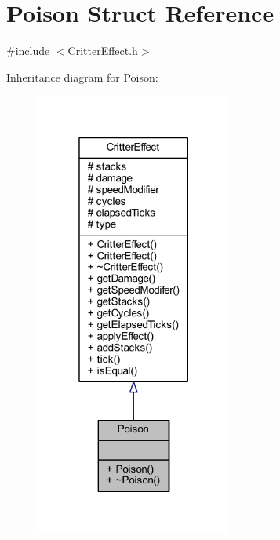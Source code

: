 \hypertarget{struct_poison}{\section{Poison Struct Reference}
\label{struct_poison}
}


{\ttfamily \#include $<$Critter\+Effect.\+h$>$}



Inheritance diagram for Poison\+:
\nopagebreak
\begin{figure}[H]
\begin{center}
\leavevmode
\includegraphics[width=184pt]{struct_poison__inherit__graph}
\end{center}
\end{figure}


